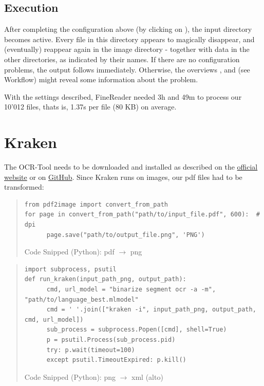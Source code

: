 \subsection{Execution}

After completing the configuration above (by clicking on ), the input directory becomes active. Every file in this directory appears to magically disappear, and (eventually) reappear again in the image directory - together with data in the other directories, as indicated by their names.
If there are no configuration problems, the output follows immediately.
Otherwise, the overviews ,  and  (see Workflow) might reveal some information about the problem.

\medskip

With the settings described, FineReader needed 3h and 49m to process our 10'012 files, thats is, 1.37s per file (80 KB) on average.

\section{Kraken}

The OCR-Tool  needs to be downloaded and installed as described on the \href{http://kraken.re/}{official website} or on \href{https://github.com/mittagessen/kraken}{GitHub}. Since Kraken runs on images, our pdf files had to be transformed:

\begin{quote}
\begin{lstlisting}
from pdf2image import convert_from_path
for page in convert_from_path("path/to/input_file.pdf", 600):  # dpi
	  page.save("path/to/output_file.png", 'PNG')
\end{lstlisting}
\vspace{-1.cm}
\begin{center}
Code Snipped (Python): pdf $\rightarrow$ png
\end{center}
\end{quote}

\begin{quote}
\begin{lstlisting}
import subprocess, psutil
def run_kraken(input_path_png, output_path):
	  cmd, url_model = "binarize segment ocr -a -m", "path/to/language_best.mlmodel"
	  cmd = ' '.join(["kraken -i", input_path_png, output_path, cmd, url_model])
	  sub_process = subprocess.Popen([cmd], shell=True)
	  p = psutil.Process(sub_process.pid)
	  try: p.wait(timeout=100)
	  except psutil.TimeoutExpired: p.kill()
\end{lstlisting}
\vspace{-1.cm}
\begin{center}
Code Snipped (Python): png $\rightarrow$ xml (alto)
\end{center}
\end{quote}


